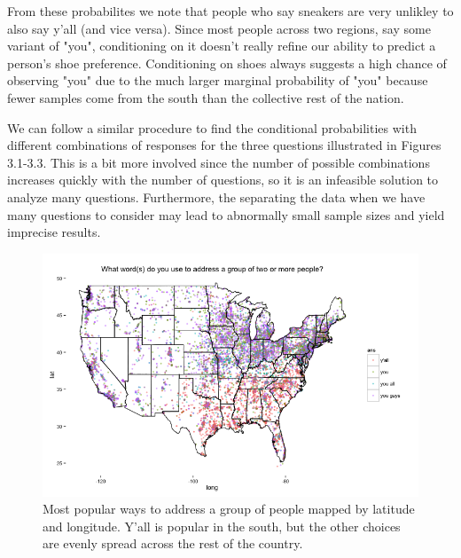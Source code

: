 \documentclass[english]{article}\usepackage{graphicx, color}
\numberwithin{equation}{section}
\numberwithin{figure}{section}
\begin{document}
From these probabilites we note that people who say sneakers are very unlikley to also say y'all (and vice versa). Since most people across two regions, say some variant of "you", conditioning on it doesn't really refine our ability to predict a person's shoe preference. Conditioning on shoes always suggests a high chance of observing "you" due to the much larger marginal probability of "you" because fewer samples come from the south than the collective rest of the nation.

We can follow a similar procedure to find the conditional probabilities with different combinations of responses for the three questions illustrated in Figures 3.1-3.3. This is a bit more involved since the number of possible combinations increases quickly with the number of questions, so it is an infeasible solution to analyze many questions. Furthermore, the separating the data when we have many questions to consider may lead to abnormally small sample sizes and yield imprecise results. 

\begin{figure}
\begin{center}
\includegraphics[scale = .5]{Rplot1.png}
\end{center}
\caption{Most popular ways to address a group of people mapped by latitude and longitude. Y'all is popular in the south, but the other choices are evenly spread across the rest of the country.}
\end{figure}
\end{document}
